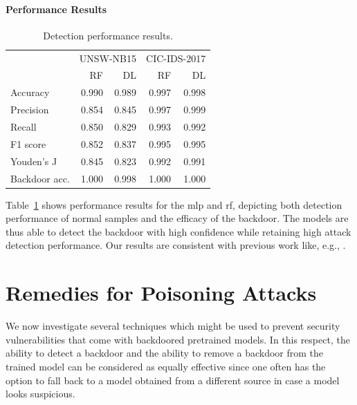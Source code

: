 \documentclass[10pt,sigconf,letterpaper,dvipsnames]{acmart}
\newcommand{\unsw}{UNSW-NB15}
\newcommand{\cic}{CIC-IDS-2017}
\begin{document}
\paragraph{Performance Results}
\begin{table}[t]
\caption{Detection performance results.} \label{tab:performance_results}
\begin{tabular}{l r r r r} \toprule
& \multicolumn{2}{r}{\unsw{}} & \multicolumn{2}{r}{\cic{}} \\
& RF & DL & RF & DL \\ \midrule
Accuracy	& 0.990 & 0.989 & 0.997 & 0.998\\
Precision	& 0.854 & 0.845 & 0.997 & 0.999\\
Recall	& 0.850 & 0.829 & 0.993 & 0.992\\
F1 score	& 0.852 & 0.837 & 0.995 & 0.995\\
Youden's J	& 0.845 & 0.823 & 0.992 & 0.991\\
Backdoor acc.	& 1.000 & 0.998 & 1.000 & 1.000\\
\bottomrule
\end{tabular}
\end{table}
Table~\ref{tab:performance_results} shows performance results for
the \gls{mlp} and \gls{rf}, depicting both detection performance of normal samples
and the efficacy of the backdoor. The models are thus able to detect the backdoor with high confidence while retaining high attack detection performance.
Our results are consistent with previous work like, e.g., \cite{meghdouri_analysis_2018}.

\section{Remedies for Poisoning Attacks}
We now investigate several techniques which might be used to prevent security vulnerabilities that
come with backdoored pretrained  models. In this respect, the ability to detect a backdoor and the ability to remove a backdoor from the trained model can be considered as equally effective since one often has the option to fall back to a model obtained from a different source in case a model looks suspicious.
\end{document}

